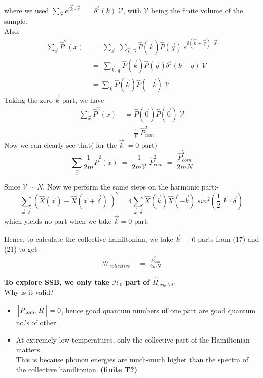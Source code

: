 \documentclass[12pt]{article}
\begin{document}
where we used $\sum_{\Vec{r}}e^{i\Vec{k}\cdot\Vec{r}}\;=\;\delta^3(k)\;\mathcal{V}$, with $\mathcal{V}$ being the finite volume of the sample.\\
Also,
\begin{align}
    \sum_{\Vec{x}} \hat{P}^2(x)\;&=\;\sum_{\Vec{x}}\;\sum_{\Vec{k},\Vec{q}} \hat{P}(\Vec{k})\hat{P}(\Vec{q})\;e^{i(\Vec{k}+\Vec{q})\cdot \Vec{x}}\\
    &=\;\sum_{\Vec{k},\Vec{q}}\hat{P}(\Vec{k})\hat{P}(\Vec{q}) \delta^3(k+q)\;\mathcal{V}\\
    &= \sum_{\Vec{k}} \hat{P}(\Vec{k}) \hat{P}(\Vec{-k}) \;\mathcal{V}
\end{align}
Taking the zero $\Vec{k}$ part, we have
\begin{align}
     \sum_{\Vec{x}} \hat{P}^2(x)\;&= \hat{P}(\Vec{0}) \hat{P}(\Vec{0})\;\mathcal{V}\\
     &= \frac{1}{\mathcal{V}}\;\hat{P}^2_{com}
\end{align}
Now we can clearly see that( for the $\vec{k}\;=0$ part)
\begin{equation}
    \sum_{\Vec{x}} \frac{1}{2m}\hat{P}^2(x)\;=\;\frac{1}{2m\mathcal{V}}\;\hat{P}^2_{com}\;=\;\frac{\hat{P}^2_{com}}{2mN}
\end{equation}


Since $\mathcal{V} \sim N$. Now we perform the same steps on the harmonic part:-
\begin{equation}
    \sum_{\vec{x},\vec{\delta}} (\hat{X}(\vec{x})-\hat{X}(\vec{x}+\vec{\delta})\;)^2 = 4 \sum_{\vec{k}, \vec{\delta}} \hat{X}(\vec{k})\hat{X}(\vec{-k})\; sin^2(\frac{1}{2}\;\vec{k}\cdot\vec{\delta})
\end{equation}
 which yields no part when we take $\vec{k}=0$ part.

Hence, to calculate the collective hamiltonian, we take $\vec{k}\;=0$ parts from (17) and (21) to get
\begin{align}
    \mathcal{H}_{collective}\;&=\;\frac{\hat{P}^2_{com}}{2mN}
\end{align}


\textbf{To explore SSB, we only take $\mathcal{H}_0$ part of $\hat{H}_{crystal}$}.\\
\newline
Why is it valid?
\begin{itemize}
    \item $\comm{P_{com}}{\hat{H}}=0$, hence good quantum numbers \textbf{of} one part are good quantum no.'s of other.
    \item At extremely low temperatures, only the collective part of the Hamiltonian matters.\\
        This is because phonon energies are much-much higher than the spectra of the collective hamiltonian. \textbf{(finite T?)}
\end{itemize}
\newpage
\end{document}
